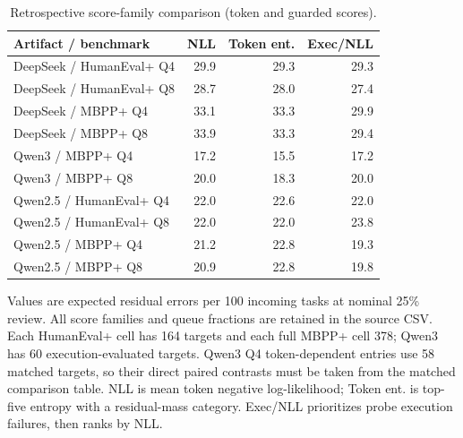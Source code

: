 \begin{table}[htbp]
\centering
\caption{Retrospective score-family comparison (token and guarded scores).}
\label{tab:scores-retrospective-2}
\footnotesize
\begin{tabular}{lrrr}
\toprule
Artifact / benchmark & NLL & Token ent. & Exec/NLL \\
\midrule
DeepSeek / HumanEval+ Q4 & 29.9 & 29.3 & 29.3 \\
DeepSeek / HumanEval+ Q8 & 28.7 & 28.0 & 27.4 \\
DeepSeek / MBPP+ Q4 & 33.1 & 33.3 & 29.9 \\
DeepSeek / MBPP+ Q8 & 33.9 & 33.3 & 29.4 \\
Qwen3 / MBPP+ Q4 & 17.2 & 15.5 & 17.2 \\
Qwen3 / MBPP+ Q8 & 20.0 & 18.3 & 20.0 \\
Qwen2.5 / HumanEval+ Q4 & 22.0 & 22.6 & 22.0 \\
Qwen2.5 / HumanEval+ Q8 & 22.0 & 22.0 & 23.8 \\
Qwen2.5 / MBPP+ Q4 & 21.2 & 22.8 & 19.3 \\
Qwen2.5 / MBPP+ Q8 & 20.9 & 22.8 & 19.8 \\
\bottomrule
\end{tabular}
\par\vspace{4pt}\begin{minipage}{0.98\linewidth}\footnotesize Values are expected residual errors per 100 incoming tasks at nominal 25\% review. All score families and queue fractions are retained in the source CSV. Each HumanEval+ cell has 164 targets and each full MBPP+ cell 378; Qwen3 has 60 execution-evaluated targets. Qwen3 Q4 token-dependent entries use 58 matched targets, so their direct paired contrasts must be taken from the matched comparison table. NLL is mean token negative log-likelihood; Token ent. is top-five entropy with a residual-mass category. Exec/NLL prioritizes probe execution failures, then ranks by NLL.\end{minipage}
\end{table}
